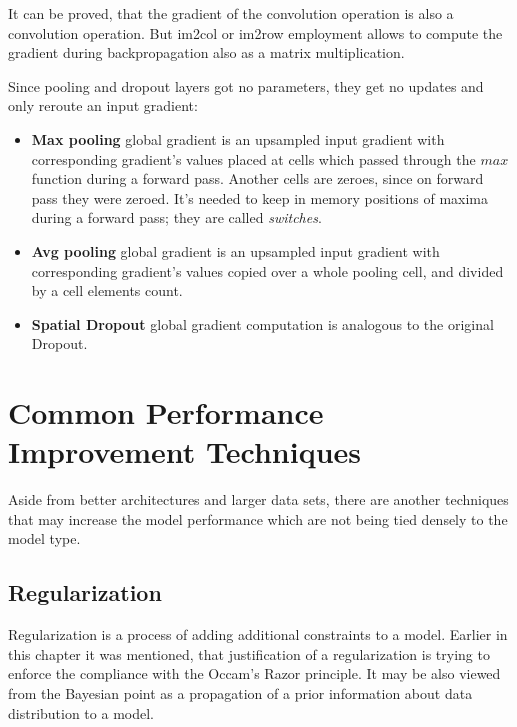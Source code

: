 \documentclass[thesis=B,english]{FITthesis}[2019/12/23]
\begin{document}
It can be proved, that the gradient of the convolution operation is also a convolution operation. But im2col or im2row employment allows to compute the gradient during backpropagation also as a matrix multiplication.

Since pooling and dropout layers got no parameters, they get no updates and only reroute an input gradient:
\begin{itemize}
	\item \textbf{Max pooling} global gradient is an upsampled input gradient with corresponding gradient's values placed at cells which passed through the $max$ function during a forward pass. Another cells are zeroes, since on forward pass they were zeroed. It's needed to keep in memory positions of maxima during a forward pass; they are called \textit{switches}.
	\item \textbf{Avg pooling} global gradient is an upsampled input gradient with corresponding gradient's values copied over a whole pooling cell, and divided by a cell elements count.
	\item \textbf{Spatial Dropout} global gradient computation is analogous to the original Dropout.
\end{itemize}

\section{Common Performance Improvement Techniques}

Aside from better architectures and larger data sets, there are another techniques that may increase the model performance which are not being tied densely to the model type.

\subsection{Regularization}

Regularization is a process of adding additional constraints to a model. Earlier in this chapter it was mentioned, that justification of a regularization is trying to enforce the compliance with the Occam's Razor principle. It may be also viewed from the Bayesian point as a propagation of a prior information about data distribution to a model.
\end{document}
